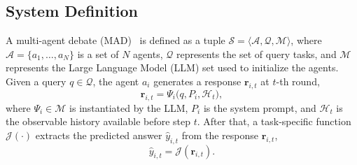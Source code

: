 \documentclass[11pt]{article}
\begin{document}


\subsection{System Definition}

A multi-agent debate (MAD)~\cite{li2023theory,kim2025towards} is defined as a tuple $\mathcal{S} = \langle \mathcal{A}, \mathcal{Q}, \mathcal{M} \rangle$, where $\mathcal{A} = \{a_1, \dots, a_N\}$ is a set of $N$ agents, $\mathcal{Q}$ represents the set of query tasks, and $\mathcal{M}$ represents the Large Language Model (LLM) set used to initialize the agents.
Given a query $q \in \mathcal{Q}$, the agent $a_i$ generates a response $\boldsymbol{r}_{i,t}$ at $t$-th round,
\begin{equation}
    \boldsymbol{r}_{i,t} = \Psi_i \bigl( q, P_i, \mathcal{H}_t \bigr), %
\end{equation}
where $\Psi_i \in \mathcal{M}$ is instantiated by the LLM,  $P_i$ is the system prompt,
and \(\mathcal{H}_t\) is the observable history available before step \(t\).
After that, a task-specific function $\mathcal{J}(\cdot)$ extracts the predicted answer $\hat{y}_{i,t}$ from the response $\boldsymbol{r}_{i,t}$,
\begin{equation}
\hat{y}_{i,t} = \mathcal{J}(\boldsymbol{r}_{i,t}).
\end{equation}
\end{document}
